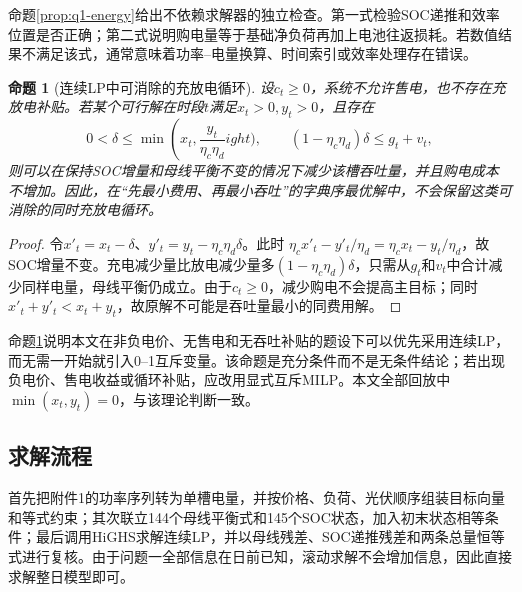 \documentclass[UTF8,12pt,a4paper]{ctexart}
\newtheorem{proposition}{命题}[section]
\theoremstyle{remark}
\begin{document}
命题\ref{prop:q1-energy}给出不依赖求解器的独立检查。第一式检验SOC递推和效率位置是否正确；第二式说明购电量等于基础净负荷再加上电池往返损耗。若数值结果不满足该式，通常意味着功率--电量换算、时间索引或效率处理存在错误。

\begin{proposition}[连续LP中可消除的充放电循环]\label{prop:no-cycle}
设$c_t\ge0$，系统不允许售电，也不存在充放电补贴。若某个可行解在时段$t$满足$x_t>0,y_t>0$，且存在
\[
0<\delta\le\min\!\left(x_t,\frac{y_t}{\eta_c\eta_d}
ight),\qquad
(1-\eta_c\eta_d)\delta\le g_t+v_t,
\]
则可以在保持SOC增量和母线平衡不变的情况下减少该槽吞吐量，并且购电成本不增加。因此，在“先最小费用、再最小吞吐”的字典序最优解中，不会保留这类可消除的同时充放电循环。
\end{proposition}
\begin{proof}
令$x'_t=x_t-\delta$、$y'_t=y_t-\eta_c\eta_d\delta$。此时
$\eta_cx'_t-y'_t/\eta_d=\eta_cx_t-y_t/\eta_d$，故SOC增量不变。充电减少量比放电减少量多$(1-\eta_c\eta_d)\delta$，只需从$g_t$和$v_t$中合计减少同样电量，母线平衡仍成立。由于$c_t\ge0$，减少购电不会提高主目标；同时$x'_t+y'_t<x_t+y_t$，故原解不可能是吞吐量最小的同费用解。
\end{proof}

命题\ref{prop:no-cycle}说明本文在非负电价、无售电和无吞吐补贴的题设下可以优先采用连续LP，而无需一开始就引入0--1互斥变量。该命题是充分条件而不是无条件结论；若出现负电价、售电收益或循环补贴，应改用显式互斥MILP。本文全部回放中$\min(x_t,y_t)=0$，与该理论判断一致。

\subsection{求解流程}
首先把附件1的功率序列转为单槽电量，并按价格、负荷、光伏顺序组装目标向量和等式约束；其次联立144个母线平衡式和145个SOC状态，加入初末状态相等条件；最后调用HiGHS求解连续LP，并以母线残差、SOC递推残差和两条总量恒等式进行复核。由于问题一全部信息在日前已知，滚动求解不会增加信息，因此直接求解整日模型即可。
\end{document}
